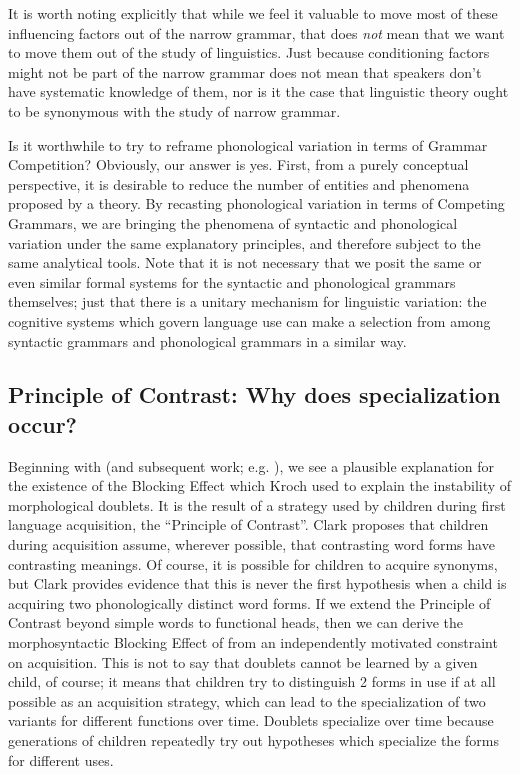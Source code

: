 It is worth noting explicitly that while we feel it valuable to move most of these influencing factors out of the narrow grammar, that does \emph{not} mean that we want to move them out of the study of linguistics. Just because conditioning factors might not be part of the narrow grammar does not mean that speakers don't have systematic knowledge of them, nor is it the case that linguistic theory ought to be synonymous with the study of narrow grammar.
 
Is it worthwhile to try to reframe phonological variation in terms of Grammar Competition?
Obviously, our answer is yes.
First, from a purely conceptual perspective, it is desirable to reduce the number of entities and phenomena proposed by a theory.
By recasting phonological variation in terms of Competing Grammars, we are bringing the phenomena of syntactic and phonological variation under the same explanatory principles, and therefore subject to the same analytical tools.
Note that it is not necessary that we posit the same or even similar formal systems for the syntactic and phonological grammars themselves; just that there is a unitary mechanism for linguistic variation: the cognitive systems which govern language use can make a selection from among syntactic grammars and phonological grammars in a similar way.

\subsection{Principle of Contrast: Why does specialization occur?}

Beginning with \citet{clark1987} (and subsequent work; e.g. \citealt{clark1990}), we see a plausible explanation for the existence of the Blocking Effect which Kroch used to explain the instability of morphological doublets.
It is the result of a strategy used by children during first language acquisition, the ``Principle of Contrast''.
Clark proposes that children during acquisition assume, wherever possible, that contrasting word forms have contrasting meanings.
Of course, it is possible for children to acquire synonyms, but Clark provides evidence that this is never the first hypothesis when a child is acquiring two phonologically distinct word forms.
If we extend the Principle of Contrast beyond simple words to functional heads, then we can derive the morphosyntactic Blocking Effect of \citet{kroch1994} from an independently motivated constraint on acquisition.
This is not to say that doublets cannot be learned by a given child, of course; it means that children try to distinguish 2 forms in use if at all possible as an acquisition strategy, which can lead to the specialization of two variants for different functions over time.
Doublets specialize over time because generations of children repeatedly try out hypotheses which specialize the forms for different uses.

